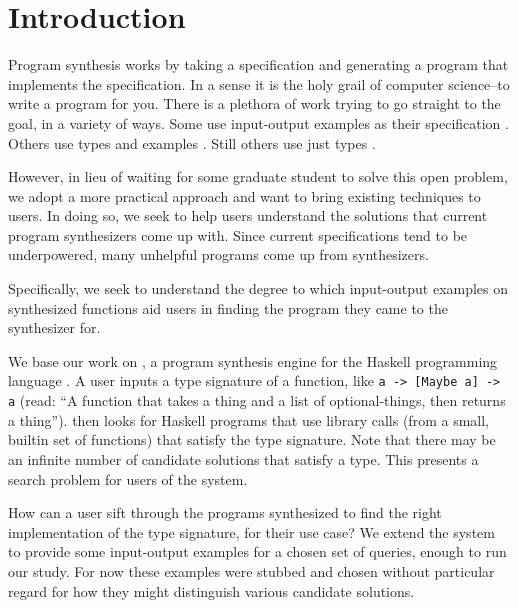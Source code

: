 \section{Introduction}

Program synthesis works by taking a specification and generating a program that
implements the specification.
%
In a sense it is the holy grail of computer science--to write a program for you.
%
There is a plethora of work trying to go straight to the goal, in a variety of ways.
%
Some use input-output examples as their specification
\cite{Feser_Chaudhuri_Dillig_2015}.
%
Others use types and examples \cite{Osera_Zdancewic_2015}.
%
Still others use just types \cite{hoogle_plus_2020}.

However, in lieu of waiting for some graduate student to solve this open
problem, we
adopt a more practical approach and want to bring existing techniques to users.
%
In doing so, we seek to help users understand the solutions that current program
synthesizers come up with.
%
Since current specifications tend to be underpowered, many unhelpful programs
come up from synthesizers.
%

Specifically, we seek to understand the degree to which input-output examples on
synthesized functions aid users
in finding the program they came to the synthesizer for.


We base our work on \hoogleplus, a program synthesis engine for the
Haskell programming language \cite{hoogle_plus_2020}.
%
A user inputs a type signature of a function, like \texttt{a -> [Maybe a] -> a}
(read: ``A function that takes a thing and a list of optional-things, then
returns a thing'').
%
\hoogleplus then looks for Haskell programs that use library calls (from
a small, builtin set of functions) that satisfy the type signature.
%
Note that there may be an infinite number of candidate solutions that satisfy a type.
%
This presents a search problem for users of the system.

How can a user sift through the programs synthesized to find the right
implementation of the type signature, for their use case?
%
We extend the system to provide some input-output examples for a chosen set of
queries, enough to run our study.
%
For now these examples were stubbed and chosen without particular regard for how
they might distinguish various candidate solutions.
%

